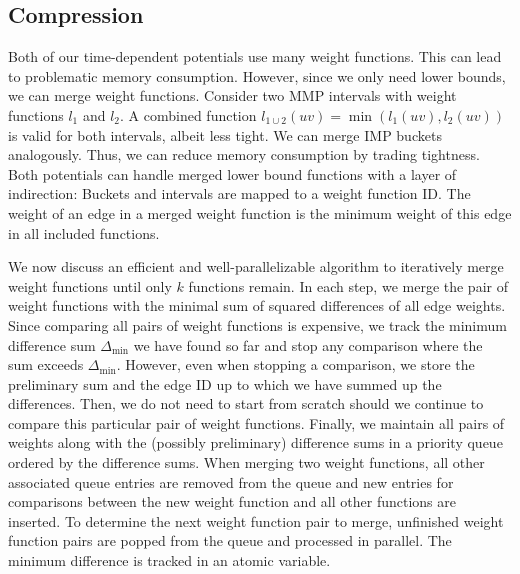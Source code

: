 \documentclass[a4paper,UKenglish,cleveref, autoref, thm-restate]{lipics-v2021}
\begin{document}
\subsection{Compression}\label{sec:compression}

Both of our time-dependent potentials use many weight functions.
This can lead to problematic memory consumption.
However, since we only need lower bounds, we can merge weight functions.
Consider two MMP intervals with weight functions $l_1$ and $l_2$.
A combined function $l_{1 \cup 2}(uv) = \min(l_1(uv), l_2(uv))$ is valid for both intervals, albeit less tight.
We can merge IMP buckets analogously.
Thus, we can reduce memory consumption by trading tightness.
Both potentials can handle merged lower bound functions with a layer of indirection:
Buckets and intervals are mapped to a weight function ID.
The weight of an edge in a merged weight function is the minimum weight of this edge in all included functions.

We now discuss an efficient and well-parallelizable algorithm to iteratively merge weight functions until only $k$ functions remain.
In each step, we merge the pair of weight functions with the minimal sum of squared differences of all edge weights.
Since comparing all pairs of weight functions is expensive, we track the minimum difference sum $\Delta_{\min}$ we have found so far and stop any comparison where the sum exceeds $\Delta_{\min}$.
However, even when stopping a comparison, we store the preliminary sum and the edge ID up to which we have summed up the differences.
Then, we do not need to start from scratch should we continue to compare this particular pair of weight functions.
Finally, we maintain all pairs of weights along with the (possibly preliminary) difference sums in a priority queue ordered by the difference sums.
When merging two weight functions, all other associated queue entries are removed from the queue and new entries for comparisons between the new weight function and all other functions are inserted.
To determine the next weight function pair to merge, unfinished weight function pairs are popped from the queue and processed in parallel.
The minimum difference is tracked in an atomic variable.
\end{document}
